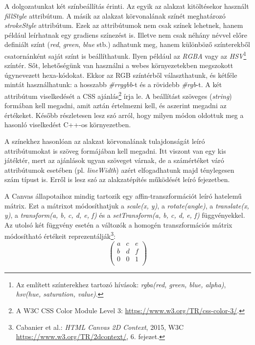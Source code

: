 \documentclass[12pt]{report}
\theoremstyle{definition}
\newcommand{\func}[1]{{\textsl{#1}}}
\begin{document}
A dolgozatunkat két színbeállítás érinti. Az egyik az alakzat kitöltésekor
használt \func{fillStyle} attribútum. A másik az alakzat körvonalának színét
meghatározó \func{strokeStyle} attribútum. Ezek az attribútumok nem csak színek
lehetnek, hanem például leírhatnak egy gradiens színezést is. Illetve nem csak
néhány névvel előre definiált színt (\func{red}, \func{green}, \func{blue}
stb.) adhatunk meg, hanem különböző színterekből csatornánként saját színt is
beállíthatunk. Ilyen például az \emph{RGBA} vagy az \emph{HSV}\footnote{Az
említett színterekhez tartozó hívások: \func{rgba(red, green, blue, alpha)},
\func{hsv(hue, saturation, value)}.} színtér. Sőt, lehetőségünk van használni a
webes környezetekben megszokott úgynevezett hexa-kódokat. Ekkor az RGB
színtérből választhatunk, és kétféle mintát használhatunk: a hosszabb
\func{\#rrggbb}-t és a rövidebb \func{\#rgb}-t. A két attribútum viselkedését a
CSS ajánlás\footnote {A W3C CSS Color Module Level 3:\footnotesize{
\url{https://www.w3.org/TR/css-color-3/}}.} írja le. A beállítást szöveges
(\func{string}) formában kell megadni, amit aztán értelmezni kell, és aszerint
megadni az értékeket. Később részletesen lesz szó arról, hogy milyen módon
oldottuk meg a hasonló viselkedést C++-os környezetben.

A színekhez hasonlóan az alakzat körvonalának tulajdonságát leíró
attribútumokat is szöveg formájában kell megadni. Itt viszont van egy kis
játéktér, mert az ajánlások ugyan szöveget várnak, de a számértéket
váró attribútumok esetében (pl. \func{lineWidth}) azért elfogadhatunk majd
ténylegesen szám típust is. Erről is lesz szó az alakzatépítés
működését leíró fejezetben.

A Canvas állapotaihoz mindig tartozik egy affin-transzformációt leíró
hatelemű mátrix. Ezt a mátrixot módosíthatjuk a \func{scale(x, y)},
a \func{rotate(angle)}, a \func{translate(x, y)},  a \func{transform(a, b, c, d,
e, f)}
és a \func{setTransform(a, b, c, d, e, f)} függvényekkel. Az utolsó két
függvény esetén a változók a homogén transzformációs mátrix módosítható értékeit
reprezentálják\footnote{Cabanier et al.: \emph{{HTML}
Canvas {2D} Context}, 2015, W3C\\ \footnotesize{
\url{https://www.w3.org/TR/2dcontext/}}, 6. fejezet.}:
\[\begin{pmatrix}a & c & e \\ b & d & f \\ 0 & 0 & 1 \\ \end{pmatrix}\]
\end{document}

